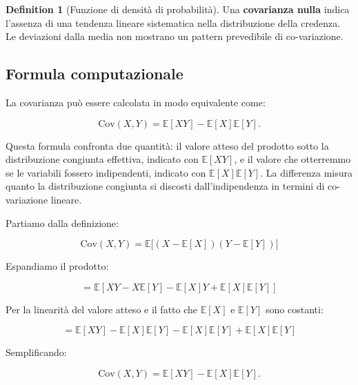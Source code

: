 \documentclass[
  letterpaper,
  DIV=11,
  numbers=noendperiod,
  oneside]{scrreprt}
\theoremstyle{definition}
\theoremstyle{plain}
\theoremstyle{definition}
\newtheorem{definition}{Definition}[chapter]
\theoremstyle{remark}
\begin{document}
\begin{definition}[Funzione di densità di
probabilità]
Una \textbf{covarianza nulla} indica l'assenza di una tendenza lineare
sistematica nella distribuzione della credenza. Le deviazioni dalla
media non mostrano un pattern prevedibile di co-variazione.

\subsection{Formula computazionale}\label{formula-computazionale}

La covarianza può essere calcolata in modo equivalente come:

\[
\text{Cov}(X, Y) = \mathbb{E}[XY] - \mathbb{E}[X]\mathbb{E}[Y].
\]

Questa formula confronta due quantità: il valore atteso del prodotto
sotto la distribuzione congiunta effettiva, indicato con
\(\mathbb{E}[XY]\), e il valore che otterremmo se le variabili fossero
indipendenti, indicato con \(\mathbb{E}[X]\mathbb{E}[Y]\). La differenza
misura quanto la distribuzione congiunta si discosti dall'indipendenza
in termini di co-variazione lineare.

\begin{tcolorbox}[enhanced jigsaw, arc=.35mm, breakable, colbacktitle=quarto-callout-note-color!10!white, opacityback=0, toprule=.15mm, rightrule=.15mm, colback=white, opacitybacktitle=0.6, leftrule=.75mm, coltitle=black, bottomtitle=1mm, left=2mm, toptitle=1mm, title=\textcolor{quarto-callout-note-color}{\faInfo}\hspace{0.5em}{Dimostrazione della formula computazionale}, titlerule=0mm, bottomrule=.15mm, colframe=quarto-callout-note-color-frame]

Partiamo dalla definizione:

\[
\text{Cov}(X, Y) = \mathbb{E}\bigl[(X - \mathbb{E}[X])(Y - \mathbb{E}[Y])\bigr]
\]

Espandiamo il prodotto:

\[
= \mathbb{E}[XY - X\mathbb{E}[Y] - \mathbb{E}[X]Y + \mathbb{E}[X]\mathbb{E}[Y]]
\]

Per la linearità del valore atteso e il fatto che \(\mathbb{E}[X]\) e
\(\mathbb{E}[Y]\) sono costanti:

\[
= \mathbb{E}[XY] - \mathbb{E}[X]\mathbb{E}[Y] - \mathbb{E}[X]\mathbb{E}[Y] + \mathbb{E}[X]\mathbb{E}[Y]
\]

Semplificando:

\[
\text{Cov}(X, Y) = \mathbb{E}[XY] - \mathbb{E}[X]\mathbb{E}[Y].
\]

\end{tcolorbox}


\end{definition}
\end{document}
